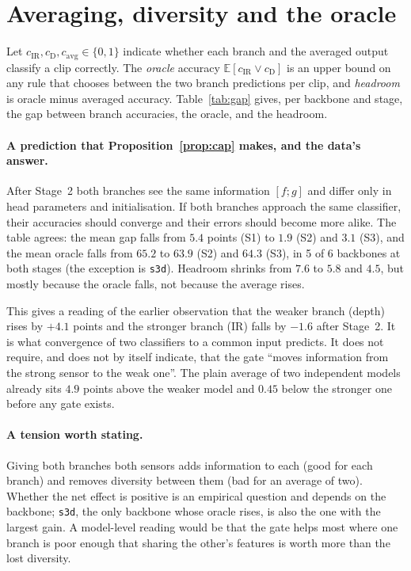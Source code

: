 \documentclass[11pt,a4paper]{article}
\theoremstyle{plain}
\theoremstyle{remark}
\newcommand{\IR}{\mathrm{IR}}
\newcommand{\Dp}{\mathrm{D}}
\begin{document}
\section{Averaging, diversity and the oracle}

Let $c_\IR,c_\Dp,c_{\mathrm{avg}}\in\{0,1\}$ indicate whether each branch and the averaged output classify a clip correctly. The \emph{oracle} accuracy $\mathbb E[c_\IR\vee c_\Dp]$ is an upper bound on any rule that chooses between the two branch predictions per clip, and \emph{headroom} is oracle minus averaged accuracy. Table~\ref{tab:gap} gives, per backbone and stage, the gap between branch accuracies, the oracle, and the headroom.

\begin{table}[h]\centering\small

\caption{Branch gap $|a_\IR-a_\Dp|$, oracle accuracy, and headroom (oracle minus averaged accuracy), all in percentage points on the 628 validation clips. S1/S2/S3 are the three stages.}\label{tab:gap}
\end{table}

\paragraph{A prediction that Proposition~\ref{prop:cap} makes, and the data's answer.}
After Stage~2 both branches see the same information $[f;g]$ and differ only in head parameters and initialisation. If both branches approach the same classifier, their accuracies should converge and their errors should become more alike. The table agrees: the mean gap falls from $5.4$ points (S1) to $1.9$ (S2) and $3.1$ (S3), and the mean oracle falls from $65.2$ to $63.9$ (S2) and $64.3$ (S3), in 5 of 6 backbones at both stages (the exception is \texttt{s3d}). Headroom shrinks from $7.6$ to $5.8$ and $4.5$, but mostly because the oracle falls, not because the average rises.

This gives a reading of the earlier observation that the weaker branch (depth) rises by $+4.1$ points and the stronger branch (IR) falls by $-1.6$ after Stage~2. It is what convergence of two classifiers to a common input predicts. It does not require, and does not by itself indicate, that the gate ``moves information from the strong sensor to the weak one''. The plain average of two independent models already sits $4.9$ points above the weaker model and $0.45$ below the stronger one before any gate exists.

\paragraph{A tension worth stating.} Giving both branches both sensors adds information to each (good for each branch) and removes diversity between them (bad for an average of two). Whether the net effect is positive is an empirical question and depends on the backbone; \texttt{s3d}, the only backbone whose oracle rises, is also the one with the largest gain. A model-level reading would be that the gate helps most where one branch is poor enough that sharing the other's features is worth more than the lost diversity.
\end{document}
